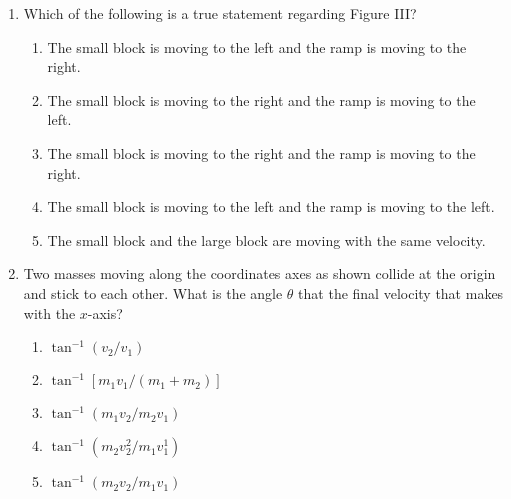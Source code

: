 \documentclass{../../../oss-apphys}
\begin{document}
\begin{multicols}{2}
\begin{enumerate}[resume,leftmargin=18pt]
  \item Which of the following is a true statement regarding Figure III?
    \label{ramps2}
    \begin{enumerate}[noitemsep,topsep=0pt,leftmargin=18pt,label=(\Alph*)]
    \item The small block is moving to the left and the ramp is moving to the
      right.
    \item The small block is moving to the right and the ramp is moving to the
      left.
    \item The small block is moving to the right and the ramp is moving to the
      right.
    \item The small block is moving to the left and the ramp is moving to the
      left.
    \item The small block and the large block are moving with the same velocity.
    \end{enumerate}
    
    \columnbreak
    
  \item Two masses moving along the coordinates axes as shown collide at the
    origin and stick to each other. What is the angle $\theta$ that the final
    velocity that makes with the $x$-axis?
    \begin{center}
    \end{center}
    \begin{enumerate}[noitemsep,topsep=0pt,leftmargin=18pt,label=(\Alph*)]
    \item $\tan^{-1}(v_2/v_1)$
    \item $\tan^{-1}[m_1v_1/(m_1+m_2)]$
    \item $\tan^{-1}(m_1v_2/m_2v_1)$
    \item $\tan^{-1}(m_2v_2^2/m_1v_1^1)$
    \item $\tan^{-1}(m_2v_2/m_1v_1)$
    \end{enumerate}
    \columnbreak
    

\end{enumerate}
\end{multicols}
\end{document}
